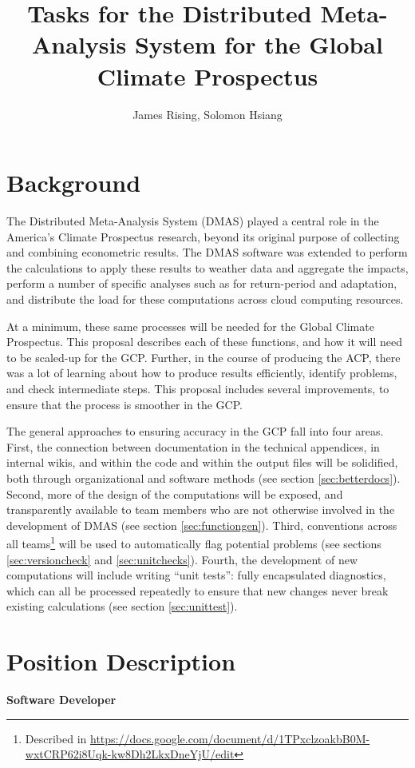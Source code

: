 \documentclass[12pt, oneside]{amsart}
\title{Tasks for the Distributed Meta-Analysis System for the Global Climate Prospectus}
\author{James Rising, Solomon Hsiang}
\begin{document}
\section{Background}

The Distributed Meta-Analysis System (DMAS) played a central role in the America's Climate Prospectus research, beyond its original purpose of collecting and combining econometric results.  The DMAS software was extended to perform the calculations to apply these results to weather data and aggregate the impacts, perform a number of specific analyses such as for return-period and adaptation, and distribute the load for these computations across cloud computing resources.

At a minimum, these same processes will be needed for the Global Climate Prospectus.  This proposal describes each of these functions, and how it will need to be scaled-up for the GCP.  Further, in the course of producing the ACP, there was a lot of learning about how to produce results efficiently, identify problems, and check intermediate steps.  This proposal includes several improvements, to ensure that the process is smoother in the GCP.

The general approaches to ensuring accuracy in the GCP fall into four areas.  First, the connection between documentation in the technical appendices, in internal wikis, and within the code and within the output files will be solidified, both through organizational and software methods (see section \ref{sec:betterdocs}).  Second, more of the design of the computations will be exposed, and transparently available to team members who are not otherwise involved in the development of DMAS (see section \ref{sec:functiongen}).  Third, conventions across all teams\footnote{Described in \url{https://docs.google.com/document/d/1TPxclzoakbB0M-wxtCRP62i8Uqk-kw8Dh2LkxDneYjU/edit}} will be used to automatically flag potential problems (see sections \ref{sec:versioncheck} and \ref{sec:unitchecks}).  Fourth, the development of new computations will include writing ``unit tests'': fully encapsulated diagnostics, which can all be processed repeatedly to ensure that new changes never break existing calculations (see section \ref{sec:unittest}).

\section{Position Description}

{\bf Software Developer}
\end{document}
